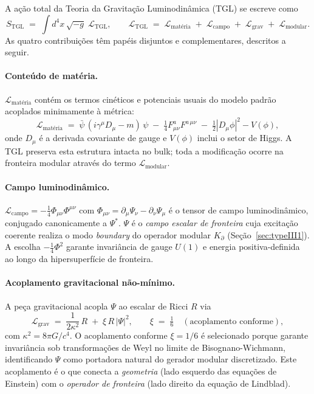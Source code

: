 \documentclass[12pt,a4paper]{article}
\newcommand{\Kpartial}{K_{\partial}}
\newcommand{\TGL}{\textsc{TGL}}
\begin{document}
A ação total da Teoria da Gravitação Luminodinâmica (\TGL{}) se escreve como
\begin{equation}
S_{\text{TGL}} \;=\; \int d^{4}x \, \sqrt{-g} \; \mathcal{L}_{\text{TGL}},
\qquad
\mathcal{L}_{\text{TGL}} \;=\;
\mathcal{L}_{\text{matéria}}
\;+\; \mathcal{L}_{\text{campo}}
\;+\; \mathcal{L}_{\text{grav}}
\;+\; \mathcal{L}_{\text{modular}}.
\label{eq:lagrangian-total}
\end{equation}
As quatro contribuições têm papéis disjuntos e complementares, descritos a seguir.

\paragraph{Conteúdo de matéria.}
$\mathcal{L}_{\text{matéria}}$ contém os termos cinéticos e potenciais usuais
do modelo padrão acoplados minimamente à métrica:
\begin{equation}
\mathcal{L}_{\text{matéria}} \;=\; \bar{\psi}\,(i\gamma^{\mu}D_{\mu} - m)\,\psi
\;-\; \tfrac{1}{4}F_{\mu\nu}^{a} F^{a\,\mu\nu}
\;-\; \tfrac{1}{2}|D_{\mu}\phi|^{2} - V(\phi),
\end{equation}
onde $D_{\mu}$ é a derivada covariante de gauge e $V(\phi)$ inclui o setor de
Higgs.  A \TGL{} preserva esta estrutura intacta no bulk; toda a modificação
ocorre na fronteira modular através do termo $\mathcal{L}_{\text{modular}}$.

\paragraph{Campo luminodinâmico.}
$\mathcal{L}_{\text{campo}} = -\tfrac{1}{4}\Phi_{\mu\nu}\Phi^{\mu\nu}$ com
$\Phi_{\mu\nu} = \partial_{\mu}\Psi_{\nu} - \partial_{\nu}\Psi_{\mu}$ é o tensor
de campo luminodinâmico, conjugado canonicamente a $\Psi^{*}$.  $\Psi$ é o
\emph{campo escalar de fronteira} cuja excitação coerente realiza o modo
\emph{boundary} do operador modular $\Kpartial$ (Seção~\ref{sec:typeIII1}).
A escolha $-\tfrac{1}{4}\Phi^{2}$ garante invariância de gauge $U(1)$ e
energia positiva-definida ao longo da hipersuperfície de fronteira.

\paragraph{Acoplamento gravitacional não-mínimo.}
A peça gravitacional acopla $\Psi$ ao escalar de Ricci $R$ via
\begin{equation}
\mathcal{L}_{\text{grav}} \;=\; \frac{1}{2\kappa^{2}}\,R
\;+\; \xi \, R \, |\Psi|^{2},
\qquad
\xi \;=\; \tfrac{1}{6} \quad (\text{acoplamento conforme}),
\end{equation}
com $\kappa^{2} = 8\pi G/c^{4}$.  O acoplamento conforme $\xi = 1/6$ é
selecionado porque garante invariância sob transformações de Weyl no limite
de Bisognano-Wichmann, identificando $\Psi$ como portadora natural do
gerador modular discretizado.  Este acoplamento é o que conecta a
\emph{geometria} (lado esquerdo das equações de Einstein) com o
\emph{operador de fronteira} (lado direito da equação de Lindblad).
\end{document}
